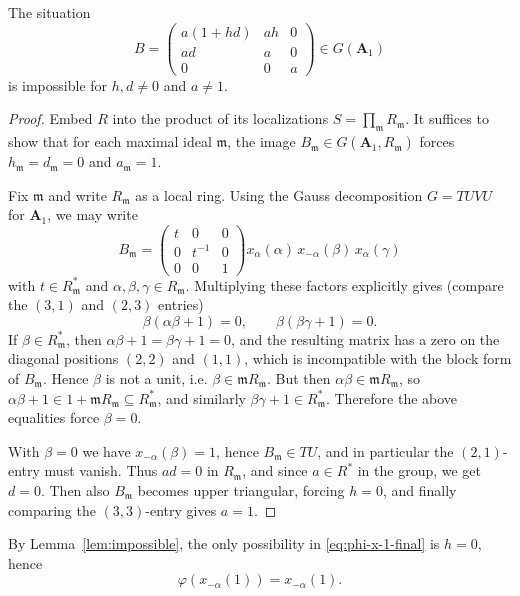\documentclass[]{jgcc}
\numberwithin{equation}{section}
\begin{document}
\begin{lem}\label{lem:impossible}
The situation
\[
B=
\begin{pmatrix}
a(1+hd)& ah& 0\\
ad& a& 0\\
0& 0& a
\end{pmatrix}\in G(\mathbf A_1)
\]
is impossible for $h,d\neq 0$ and $a\neq 1$.
\end{lem}

\begin{proof}
Embed $R$ into the product of its localizations $S=\prod_{\mathfrak m} R_{\mathfrak m}$.
It suffices to show that for each maximal ideal $\mathfrak m$, the image $B_{\mathfrak m}\in G(\mathbf A_1,R_{\mathfrak m})$
forces $h_{\mathfrak m}=d_{\mathfrak m}=0$ and $a_{\mathfrak m}=1$.

Fix $\mathfrak m$ and write $R_{\mathfrak m}$ as a local ring.
Using the Gauss decomposition $G=TUVU$ for $\mathbf A_1$, we may write
\[
B_{\mathfrak m}=
\begin{pmatrix}
t& 0& 0\\
0& t^{-1}& 0\\
0& 0& 1
\end{pmatrix}
x_\alpha(\alpha)\,x_{-\alpha}(\beta)\,x_\alpha(\gamma)
\]
with $t\in R_{\mathfrak m}^*$ and $\alpha,\beta,\gamma\in R_{\mathfrak m}$.
Multiplying these factors explicitly gives (compare the $(3,1)$ and $(2,3)$ entries)
\[
\beta(\alpha\beta+1)=0,\qquad \beta(\beta\gamma+1)=0.
\]
If $\beta\in R_{\mathfrak m}^*$, then $\alpha\beta+1=\beta\gamma+1=0$, and the resulting matrix has a zero
on the diagonal positions $(2,2)$ and $(1,1)$, which is incompatible with the block form of $B_{\mathfrak m}$.
Hence $\beta$ is not a unit, i.e. $\beta\in\mathfrak mR_{\mathfrak m}$.
But then $\alpha\beta\in\mathfrak mR_{\mathfrak m}$, so $\alpha\beta+1\in 1+\mathfrak mR_{\mathfrak m}\subseteq R_{\mathfrak m}^*$,
and similarly $\beta\gamma+1\in R_{\mathfrak m}^*$.
Therefore the above equalities force $\beta=0$.

With $\beta=0$ we have $x_{-\alpha}(\beta)=1$, hence $B_{\mathfrak m}\in TU$, and in particular the $(2,1)$-entry must vanish.
Thus $ad=0$ in $R_{\mathfrak m}$, and since $a\in R^*$ in the group, we get $d=0$.
Then also $B_{\mathfrak m}$ becomes upper triangular, forcing $h=0$, and finally comparing the $(3,3)$-entry gives $a=1$.
\end{proof}

By Lemma~\ref{lem:impossible}, the only possibility in \eqref{eq:phi-x-1-final} is $h=0$, hence
\[
\varphi(x_{-\alpha}(1))=x_{-\alpha}(1).
\]
\end{document}
